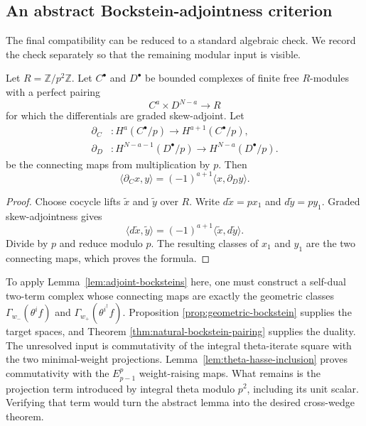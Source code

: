 \subsection{An abstract Bockstein-adjointness criterion}

The final compatibility can be reduced to a standard algebraic check.  We
record the check separately so that the remaining modular input is visible.

\begin{lemma}
\label{lem:adjoint-bocksteins}
Let $R=\mathbb Z/p^2\mathbb Z$.  Let $C^\bullet$ and $D^\bullet$ be bounded
complexes of finite free $R$-modules with a perfect pairing
\[
 C^a\times D^{N-a}\longrightarrow R
\]
for which the differentials are graded skew-adjoint.  Let
\[
 \begin{aligned}
 \partial_C&:H^a(C^\bullet/p)
       \longrightarrow H^{a+1}(C^\bullet/p),\\
 \partial_D&:H^{N-a-1}(D^\bullet/p)
       \longrightarrow H^{N-a}(D^\bullet/p).
 \end{aligned}
\]
be the connecting maps from multiplication by $p$.  Then
\[
 \langle\partial_Cx,y\rangle
   =(-1)^{a+1}\langle x,\partial_Dy\rangle.
\]
\end{lemma}

\begin{proof}
Choose cocycle lifts $\widetilde x$ and $\widetilde y$ over $R$.  Write
$d\widetilde x=p x_1$ and $d\widetilde y=p y_1$.  Graded
skew-adjointness gives
\[
 \langle d\widetilde x,\widetilde y\rangle
   =(-1)^{a+1}\langle\widetilde x,d\widetilde y\rangle.
\]
Divide by $p$ and reduce modulo $p$.  The resulting classes of $x_1$ and
$y_1$ are the two connecting maps, which proves the formula.
\end{proof}

To apply Lemma~\ref{lem:adjoint-bocksteins} here, one must construct a
self-dual two-term complex whose connecting maps are exactly the geometric
classes $\Gamma_{w_-}(\theta^if)$ and
$\Gamma_{w_+}(\theta^{i^\dagger}f)$.  Proposition
\ref{prop:geometric-bockstein} supplies the target spaces, and Theorem
\ref{thm:natural-bockstein-pairing} supplies the duality.  The unresolved
input is commutativity of the integral theta-iterate square with the two
minimal-weight projections.  Lemma~\ref{lem:theta-hasse-inclusion} proves
commutativity with the $E_{p-1}^p$ weight-raising maps.  What remains is
the projection term introduced by integral theta modulo $p^2$, including
its unit scalar.  Verifying that term would turn the abstract lemma into
the desired cross-wedge theorem.
